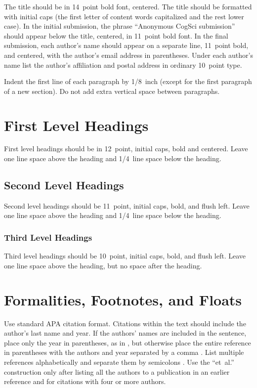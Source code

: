 \documentclass[10pt,letterpaper]{article}
\begin{document}
The title should be in 14~point bold font, centered. The title should
be formatted with initial caps (the first letter of content words
capitalized and the rest lower case). In the initial submission, the
phrase ``Anonymous CogSci submission'' should appear below the title,
centered, in 11~point bold font.  In the final submission, each
author's name should appear on a separate line, 11~point bold, and
centered, with the author's email address in parentheses. Under each
author's name list the author's affiliation and postal address in
ordinary 10~point type.

Indent the first line of each paragraph by 1/8~inch (except for the
first paragraph of a new section). Do not add extra vertical space
between paragraphs.


\section{First Level Headings}

First level headings should be in 12~point, initial caps, bold and
centered. Leave one line space above the heading and 1/4~line space
below the heading.


\subsection{Second Level Headings}

Second level headings should be 11~point, initial caps, bold, and
flush left. Leave one line space above the heading and 1/4~line
space below the heading.


\subsubsection{Third Level Headings}

Third level headings should be 10~point, initial caps, bold, and flush
left. Leave one line space above the heading, but no space after the
heading.


\section{Formalities, Footnotes, and Floats}

Use standard APA citation format. Citations within the text should
include the author's last name and year. If the authors' names are
included in the sentence, place only the year in parentheses, as in
, but otherwise place the entire reference in
parentheses with the authors and year separated by a comma
\cite{NewellSimon1972a}. List multiple references alphabetically and
separate them by semicolons
\cite{ChalnickBillman1988a,NewellSimon1972a}. Use the
``et~al.'' construction only after listing all the authors to a
publication in an earlier reference and for citations with four or
more authors.
\end{document}

